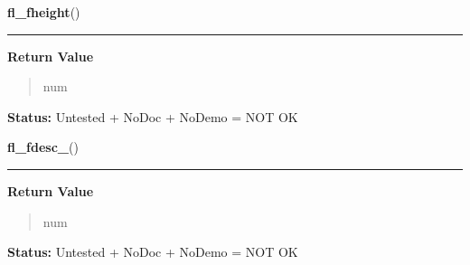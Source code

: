     \label{xformslib:library:fl_fheight_}

    \vspace{0.5ex}

\hspace{.8\funcindent}\begin{boxedminipage}{\funcwidth}

    \raggedright \textbf{fl\_fheight}()

    \vspace{-1.5ex}

    \rule{\textwidth}{0.5\fboxrule}
\setlength{\parskip}{2ex}
\setlength{\parskip}{1ex}
      \textbf{Return Value}
    \vspace{-1ex}

      \begin{quote}
      num

      \end{quote}

\textbf{Status:} Untested + NoDoc + NoDemo = NOT OK



    \end{boxedminipage}

    \label{xformslib:library:fl_fdesc_}

    \vspace{0.5ex}

\hspace{.8\funcindent}\begin{boxedminipage}{\funcwidth}

    \raggedright \textbf{fl\_fdesc\_}()

    \vspace{-1.5ex}

    \rule{\textwidth}{0.5\fboxrule}
\setlength{\parskip}{2ex}
\setlength{\parskip}{1ex}
      \textbf{Return Value}
    \vspace{-1ex}

      \begin{quote}
      num

      \end{quote}

\textbf{Status:} Untested + NoDoc + NoDemo = NOT OK



    \end{boxedminipage}

